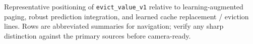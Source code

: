 \begin{table}[t]
  \centering
  \footnotesize
  \caption{Representative positioning of \texttt{evict\_value\_v1} relative to learning-augmented paging, robust prediction integration, and learned cache replacement / eviction lines.
  Rows are abbreviated summaries for navigation; verify any sharp distinction against the primary sources before camera-ready.}
  \label{tab:related-learned-caching}
  
\end{table}
